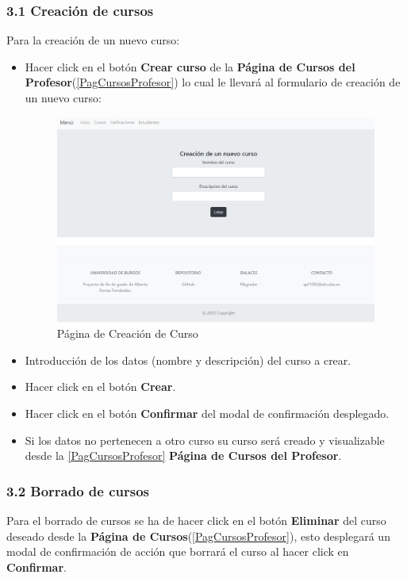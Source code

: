\subsubsection{3.1 Creación de cursos}
Para la creación de un nuevo curso:
\begin{itemize}
\tightlist
\item Hacer click en el botón \textbf{Crear curso} de la \textbf{Página de Cursos del Profesor}(\ref{PagCursosProfesor}) lo cual le llevará al formulario de creación de un nuevo curso:
\begin{figure}[H]
\centering
\includegraphics[width=\textwidth]{img/imgs-memoria/CrearCurso.PNG}
\caption{Página de Creación de Curso}
\end{figure}
\item Introducción de los datos (nombre y descripción) del curso a crear.
\item Hacer click en el botón \textbf{Crear}.
\item Hacer click en el botón \textbf{Confirmar} del modal de confirmación desplegado.
\item Si los datos no pertenecen a otro curso su curso será creado y visualizable desde la \ref{PagCursosProfesor} \textbf{Página de Cursos del Profesor}.
\end{itemize}


\subsubsection{3.2 Borrado de cursos}
Para el borrado de cursos se ha de hacer click en el botón \textbf{Eliminar} del curso deseado desde la \textbf{Página de Cursos}(\ref{PagCursosProfesor}), esto desplegará un modal de confirmación de acción que borrará el curso al hacer click en \textbf{Confirmar}.





